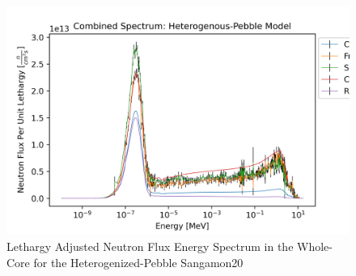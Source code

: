 \begin{figure}[H]
\centering

  \includegraphics[width=0.95\linewidth]{figures/all_spec_het_v2_er}
  \caption{Lethargy Adjusted Neutron Flux Energy Spectrum in the Whole-Core for the Heterogenized-Pebble Sangamon20}
  \label{fig:het-all}

\end{figure}

%
%
%
%
%
%
%
%
%
%
%
%
